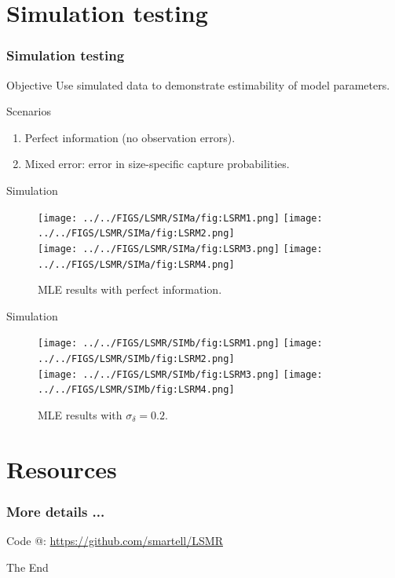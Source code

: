 \documentclass{beamer}
\begin{document}
\section{Simulation testing} %
\label{sec:simulation_testing}


\begin{frame}
	\frametitle{Simulation testing}
	\begin{block} {Objective}
		Use simulated data to demonstrate estimability of model parameters.
	\end{block}
	\begin{block}{Scenarios}
		\begin{enumerate}
			\item Perfect information (no observation errors).
			\item Mixed error: error in size-specific capture probabilities.
		\end{enumerate}
	\end{block}
\end{frame}

\begin{frame}{Simulation}
	\begin{figure}[htbp]
		\centering
			\texttt{[image: ../../FIGS/LSMR/SIMa/fig:LSRM1.png]}
			\texttt{[image: ../../FIGS/LSMR/SIMa/fig:LSRM2.png]}\\
			\texttt{[image: ../../FIGS/LSMR/SIMa/fig:LSRM3.png]}
			\texttt{[image: ../../FIGS/LSMR/SIMa/fig:LSRM4.png]}
		\caption{MLE results with perfect information.}
		\label{fig:FIGS_LSMR_fig:LSRM1}
	\end{figure}	
\end{frame}

\begin{frame}{Simulation}
	\begin{figure}[htbp]
		\centering
			\texttt{[image: ../../FIGS/LSMR/SIMb/fig:LSRM1.png]}
			\texttt{[image: ../../FIGS/LSMR/SIMb/fig:LSRM2.png]}\\
			\texttt{[image: ../../FIGS/LSMR/SIMb/fig:LSRM3.png]}
			\texttt{[image: ../../FIGS/LSMR/SIMb/fig:LSRM4.png]}
		\caption{MLE results with $\sigma_\delta = 0.2$.}
		\label{fig:FIGS_LSMR_fig:LSRM1}
	\end{figure}	
\end{frame}


% 
\section{Resources} %
\label{sec:resources}


\begin{frame}
	\frametitle{More details ...}
	
	Code @:
	\url{https://github.com/smartell/LSMR}
\end{frame}



 
\begin{frame}
\centerline{The End}
\end{frame}
\end{document}
